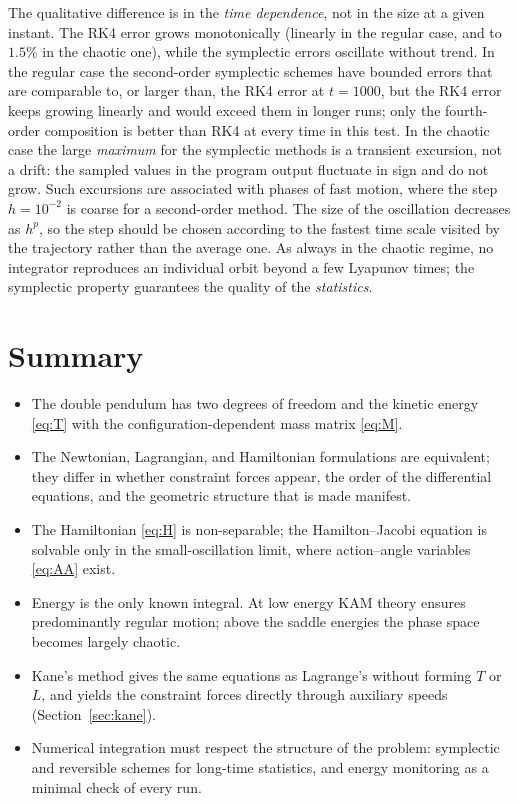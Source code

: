 \documentclass[11pt,a4paper]{book}
\theoremstyle{definition}
\theoremstyle{remark}
\begin{document}
The qualitative difference is in the \emph{time dependence}, not in the size at a given instant. The RK4 error grows
monotonically (linearly in the regular case, and to $1.5\%$ in the chaotic one), while the symplectic errors oscillate
without trend. In the regular case the second-order symplectic schemes have bounded errors that are comparable to, or larger than,
the RK4 error at $t=1000$, but the RK4 error keeps growing linearly and would exceed them in longer runs; only the
fourth-order composition is better than RK4 at every time in this test. In the chaotic case the large
\emph{maximum} for the symplectic methods is a transient excursion, not a drift: the sampled values in the program
output fluctuate in sign and do not grow. Such excursions are associated with phases of fast motion, where the step
$h=10^{-2}$ is coarse for a second-order method. The size of the oscillation decreases as $h^p$, so the step should be
chosen according to the fastest time scale visited by the trajectory rather than the average one. As always in the chaotic regime, no integrator reproduces an individual
orbit beyond a few Lyapunov times; the symplectic property guarantees the quality of the \emph{statistics}.

\section{Summary}

\begin{itemize}
  \item The double pendulum has two degrees of freedom and the kinetic energy
        \eqref{eq:T} with the configuration-dependent mass matrix \eqref{eq:M}.
  \item The Newtonian, Lagrangian, and Hamiltonian formulations are equivalent; they differ in whether constraint
        forces appear, the order of the differential equations, and the geometric structure that is made manifest.
  \item The Hamiltonian \eqref{eq:H} is non-separable; the Hamilton--Jacobi equation is solvable only in the small-oscillation
        limit, where action--angle variables \eqref{eq:AA} exist.
  \item Energy is the only known integral. At low energy KAM theory ensures predominantly regular motion; above the saddle
        energies the phase space becomes largely chaotic.
  \item Kane's method gives the same equations as Lagrange's without forming $T$ or $L$, and yields the constraint
        forces directly through auxiliary speeds (Section~\ref{sec:kane}).
  \item Numerical integration must respect the structure of the problem: symplectic and reversible schemes for
        long-time statistics, and energy monitoring as a minimal check of every run.
\end{itemize}
\end{document}
